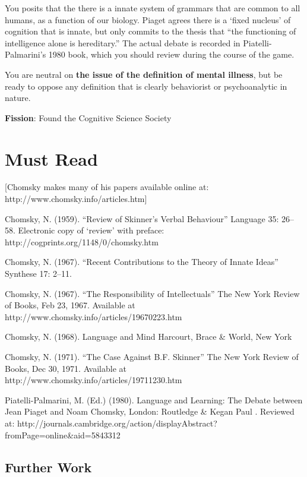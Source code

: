 \begin{refsection}
You posits that the there is a innate system of grammars that are common to all humans, as a function of our biology. Piaget agrees there is a `fixed nucleus' of cognition that is innate, but only commits to the thesis that ``the functioning of intelligence alone is hereditary.'' The actual debate is recorded in Piatelli-Palmarini's 1980 book, which you should review during the course of the game.

You are neutral on \textbf{the issue of the definition of mental illness}, but be ready to oppose any definition that is clearly behaviorist or psychoanalytic in nature.

\textbf{Fission}: Found the Cognitive Science Society

\section{Must Read}
\label{mustread}

[Chomsky makes many of his papers available online at: http:\slash \slash www.chomsky.info\slash articles.htm]

Chomsky, N. (1959). ``Review of Skinner's Verbal Behaviour'' Language 35: 26--58. Electronic copy of `review' with preface: http:\slash \slash cogprints.org\slash 1148\slash 0\slash chomsky.htm

Chomsky, N. (1967). ``Recent Contributions to the Theory of Innate Ideas'' Synthese 17: 2--11.

Chomsky, N. (1967). ``The Responsibility of Intellectuals'' The New York Review of Books, Feb 23, 1967. Available at http:\slash \slash www.chomsky.info\slash articles\slash 19670223.htm

Chomsky, N. (1968). Language and Mind Harcourt, Brace \& World, New York

Chomsky, N. (1971). ``The Case Against B.F. Skinner'' The New York Review of Books, Dec 30, 1971. Available at http:\slash \slash www.chomsky.info\slash articles\slash 19711230.htm

Piatelli-Palmarini, M. (Ed.) (1980). Language and Learning: The Debate between Jean Piaget and Noam Chomsky, London: Routledge \& Kegan Paul . Reviewed at: http:\slash \slash journals.cambridge.org\slash action\slash displayAbstract?fromPage=online\&aid=5843312

\subsection{Further Work}
\label{furtherwork}


\end{refsection}
